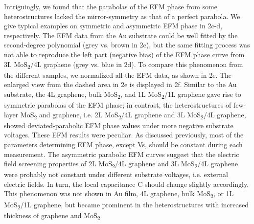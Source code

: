 Intriguingly, we found that the parabolas of the EFM phase from some heterostructures lacked the mirror-symmetry as that of a perfect parabola. We give typical examples on symmetric and asymmetric EFM phase in  2c-d, respectively. The EFM data from the Au substrate could be well fitted by the second-degree polynomial (grey vs. brown in  2c), but the same fitting process was not able to reproduce the left part (negative bias) of the EFM phase curve from 3L MoS\textsubscript{2}/4L graphene (grey vs. blue in  2d). To compare this phenomenon from the different samples, we normalized all the EFM data, as shown in  2e. The enlarged view from the dashed area in  2e is displayed in  2f. Similar to the Au substrate, the 4L graphene, bulk MoS\textsubscript{2}, and 1L MoS\textsubscript{2}/1L graphene gave rise to symmetric parabolas of the EFM phase; in contrast, the heterostructures of few-layer MoS\textsubscript{2} and graphene, i.e. 2L MoS\textsubscript{2}/4L graphene and 3L MoS\textsubscript{2}/4L graphene, showed deviated-parabolic EFM phase values under more negative substrate voltages. These EFM results were peculiar. As discussed previously, most of the parameters determining EFM phase, except Vs, should be constant during each measurement. The asymmetric parabolic EFM curves suggest that the electric field screening properties of 2L MoS\textsubscript{2}/4L graphene and 3L MoS\textsubscript{2}/4L graphene were probably not constant under different substrate voltages, i.e. external electric fields. In turn, the local capacitance C should change slightly accordingly. This phenomenon was not shown in Au film, 4L graphene, bulk MoS\textsubscript{2}, or 1L MoS\textsubscript{2}/1L graphene, but became prominent in the heterostructures with increased thickness of graphene and MoS\textsubscript{2}.

